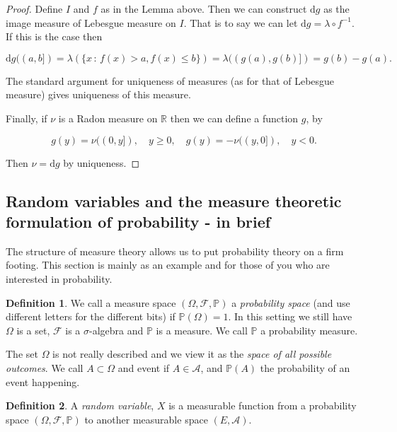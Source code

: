 \documentclass[
]{book}
\theoremstyle{definition}
\newtheorem{definition}{Definition}[chapter]
\theoremstyle{definition}
\theoremstyle{definition}
\theoremstyle{definition}
\theoremstyle{remark}
\begin{document}
\begin{proof}
Define \(I\) and \(f\) as in the Lemma above. Then we can construct \(\mathrm{d}g\) as the image measure of Lebesgue measure on \(I\). That is to say we can let \(\mathrm{d}g = \lambda \circ f^{-1}\). If this is the case then

\[ \mathrm{d}g ((a,b]) = \lambda \left(\{ x \, :\, f(x) > a, f(x) \leq b \} \right) = \lambda ((g(a), g(b)]) = g(b) - g(a). \]

The standard argument for uniqueness of measures (as for that of Lebesgue measure) gives uniqueness of this measure.

Finally, if \(\nu\) is a Radon measure on \(\mathbb{R}\) then we can define a function \(g\), by

\[ g(y) = \nu((0,y]), \quad y \geq 0, \quad g(y) = -\nu((y,0]), \quad y<0. \]

Then \(\nu = \mathrm{d}g\) by uniqueness.
\end{proof}

\hypertarget{random-variables-and-the-measure-theoretic-formulation-of-probability---in-brief}{%
\subsection{Random variables and the measure theoretic formulation of probability - in brief}\label{random-variables-and-the-measure-theoretic-formulation-of-probability---in-brief}}

The structure of measure theory allows us to put probability theory on a firm footing. This section is mainly as an example and for those of you who are interested in probability.

\begin{definition}
We call a measure space \((\Omega, \mathcal{F}, \mathbb{P})\) a \emph{probability space} (and use different letters for the different bits) if \(\mathbb{P}(\Omega) = 1\). In this setting we still have \(\Omega\) is a set, \(\mathcal{F}\) is a \(\sigma\)-algebra and \(\mathbb{P}\) is a measure. We call \(\mathbb{P}\) a probability measure.
\end{definition}

The set \(\Omega\) is not really described and we view it as the \emph{space of all possible outcomes}. We call \(A \subset \Omega\) and event if \(A \in \mathcal{A}\), and \(\mathbb{P}(A)\) the probability of an event happening.

\begin{definition}
A \emph{random variable}, \(X\) is a measurable function from a probability space \((\Omega, \mathcal{F}, \mathbb{P})\) to another measurable space \((E, \mathcal{A})\).
\end{definition}
\end{document}
